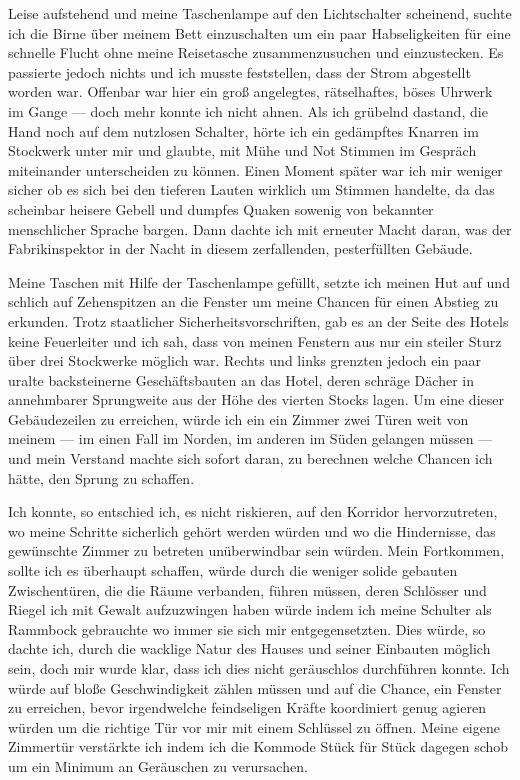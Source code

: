 Leise aufstehend und meine Taschenlampe auf den Lichtschalter scheinend, suchte ich die Birne über meinem Bett einzuschalten um ein paar Habseligkeiten für eine schnelle Flucht ohne meine Reisetasche zusammenzusuchen und einzustecken. Es passierte jedoch nichts und ich musste feststellen, dass der Strom abgestellt worden war. Offenbar war hier ein groß angelegtes, rätselhaftes, böses Uhrwerk im Gange --- doch mehr konnte ich nicht ahnen. Als ich grübelnd dastand, die Hand noch auf dem nutzlosen Schalter, hörte ich ein gedämpftes Knarren im Stockwerk unter mir und glaubte, mit Mühe und Not Stimmen im Gespräch miteinander unterscheiden zu können. Einen Moment später war ich mir weniger sicher ob es sich bei den tieferen Lauten wirklich um Stimmen handelte, da das scheinbar heisere Gebell und dumpfes Quaken sowenig von bekannter menschlicher Sprache bargen. Dann dachte ich mit erneuter Macht daran, was der Fabrikinspektor in der Nacht in diesem zerfallenden, pesterfüllten Gebäude.

Meine Taschen mit Hilfe der Taschenlampe gefüllt, setzte ich meinen Hut auf und schlich auf Zehenspitzen an die Fenster um meine Chancen für einen Abstieg zu erkunden. Trotz staatlicher Sicherheitsvorschriften, gab es an der Seite des Hotels keine Feuerleiter und ich sah, dass von meinen Fenstern aus nur ein steiler Sturz über drei Stockwerke möglich war. Rechts und links grenzten jedoch ein paar uralte backsteinerne Geschäftsbauten an das Hotel, deren schräge Dächer in annehmbarer Sprungweite aus der Höhe des vierten Stocks lagen. Um eine dieser Gebäudezeilen zu erreichen, würde ich ein ein Zimmer zwei Türen weit von meinem --- im einen Fall im Norden, im anderen im Süden gelangen müssen --- und mein Verstand machte sich sofort daran, zu berechnen welche Chancen ich hätte, den Sprung zu schaffen.

Ich konnte, so entschied ich, es nicht riskieren, auf den Korridor hervorzutreten, wo meine Schritte sicherlich gehört werden würden und wo die Hindernisse, das gewünschte Zimmer zu betreten unüberwindbar sein würden. Mein Fortkommen, sollte ich es überhaupt schaffen, würde durch die weniger solide gebauten Zwischentüren, die die Räume verbanden, führen müssen, deren Schlösser und Riegel ich mit Gewalt aufzuzwingen haben würde indem ich meine Schulter als Rammbock gebrauchte wo immer sie sich mir entgegensetzten. Dies würde, so dachte ich, durch die wacklige Natur des Hauses und seiner Einbauten möglich sein, doch mir wurde klar, dass ich dies nicht geräuschlos durchführen konnte. Ich würde auf bloße Geschwindigkeit zählen müssen und auf die Chance, ein Fenster zu erreichen, bevor irgendwelche feindseligen Kräfte koordiniert genug agieren würden um die richtige Tür vor mir mit einem Schlüssel zu öffnen. Meine eigene Zimmertür verstärkte ich indem ich die Kommode Stück für Stück dagegen schob um ein Minimum an Geräuschen zu verursachen.

